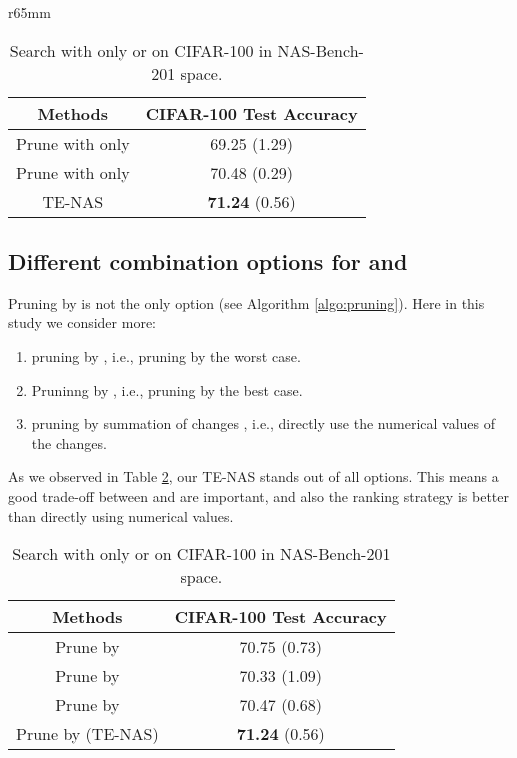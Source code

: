 \documentclass{article} \usepackage{iclr2021_conference,times}
\begin{document}
\begin{wrapfigure}{r}{65mm}
\begin{center}
\begin{table}[h!]
\caption{Search with only  or  on CIFAR-100 in NAS-Bench-201 space.}
\centering
\footnotesize
\begin{tabular}{cc}
\toprule
Methods & CIFAR-100 Test Accuracy \\ \midrule
Prune with only  & 69.25 (1.29) \\
Prune with only  & 70.48 (0.29) \\
TE-NAS & \textbf{71.24} (0.56) \\ \bottomrule
\end{tabular}
\label{table:search_only_k_R}
\end{table}


\subsection{Different combination options for  and }\label{sec:appendix_prune_option}

Pruning by  is not the only option (see Algorithm \ref{algo:pruning}). Here in this study we consider more:
\begin{enumerate}
    \item[1)] pruning by , i.e., pruning by the worst case.
    \item[2)] Pruninng by , i.e., pruning by the best case.
    \item[3)] pruning by summation of changes , i.e., directly use the numerical values of the changes.
\end{enumerate}

As we observed in Table \ref{table:prune_options}, our TE-NAS stands out of all options. This means a good trade-off between  and  are important, and also the ranking strategy is better than directly using numerical values.

\begin{table}[h!]
\caption{Search with only  or  on CIFAR-100 in NAS-Bench-201 space.}
\centering
\footnotesize
\begin{tabular}{cc}
\toprule
Methods & CIFAR-100 Test Accuracy \\ \midrule
Prune by  & 70.75 (0.73) \\
Prune by  & 70.33 (1.09) \\
Prune by  & 70.47 (0.68) \\
Prune by  (TE-NAS) & \textbf{71.24} (0.56) \\ \bottomrule
\end{tabular}
\label{table:prune_options}
\end{table}


\end{center}
\end{wrapfigure}
\end{document}
